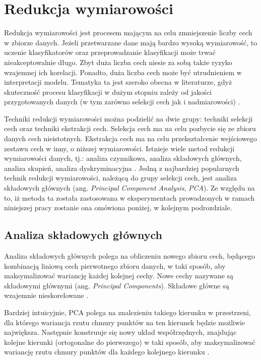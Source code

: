 \documentclass[notitlepage]{report}
\begin{document}
\chapter{Redukcja wymiarowości}
Redukcja wymiarowości jest procesem mającym na celu zmniejszenie liczby cech w zbiorze danych. Jeżeli przetwarzane dane mają bardzo wysoką wymiarowość, to uczenie klasyfikatorów oraz przeprowadzanie klasyfikacji może trwać nieakceptowalnie długo. Zbyt duża liczba cech niesie za sobą także ryzyko wzajemnej ich korelacji. Ponadto, duża liczba cech może być utrudnieniem w interpretacji modelu. Tematyka ta jest szeroko obecna w literaturze, gdyż skuteczność procesu klasyfikacji w dużym stopniu zależy od jakości przygotowanych danych (w tym zarówno selekcji cech jak i nadmiarowości) \cite{hall} \cite{verleysen} \cite{kotsiantis}.

Techniki redukcji wymiarowości można podzielić na dwie grupy: techniki selekcji cech oraz techniki ekstrakcji cech. Selekcja cech ma na celu pozbycie się ze zbioru danych cech nieistotnych. Ekstrakcja cech ma na celu przekształcenie wejściowego zestawu cech w inny, o niższej wymiarowości. Istnieje wiele metod redukcji wymiarowości danych, tj.: analiza czynnikowa, analiza składowych głównych, analiza skupień, analiza dyskryminacyjna \cite{fodor} \cite{dhavamany} \cite{tharwat} . Jedną z najbardziej popularnych technik redukcji wymiarowości, należącą do grupy selekcji cech, jest analiza składowych głównych (ang. \textit{Principal Component Analysis}, \textit{PCA}). Ze względu na to, iż metoda ta została zastosowana w eksperymentach prowadzonych w ramach niniejszej pracy zostanie ona omówiona poniżej, w kolejnym podrozdziale.

\section{Analiza składowych głównych}
Analiza składowych głównych polega na obliczeniu nowego zbioru cech, będącego kombinacją liniową cech pierwotnego zbioru danych, w taki sposób, aby maksymalizować wariancję każdej kolejnej cechy. Nowe cechy nazywane są składowymi głównymi (ang. \textit{Principal Components}). Składowe główne są wzajemnie nieskorelowane \cite{tharwat} \cite{joliffe} \cite{gewers}. 

Bardziej intuicyjnie, PCA polega na znalezieniu takiego kierunku w przestrzeni, dla którego wariancja rzutu chmury punktów na ten kierunek będzie możliwie największa. Następnie konstruuje się nowy układ współrzędnych, znajdując kolejne kierunki (ortogonalne do pierwszego) w taki sposób, aby maksymalizować wariancję rzutu chmury punktów dla każdego kolejnego kierunku \cite{tharwat} \cite{joliffe} \cite{gewers}. 
\end{document}
